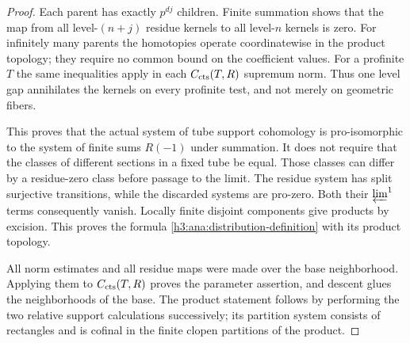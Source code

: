 \begin{proof}
Each parent has exactly $p^{dj}$ children.  Finite summation
shows that the map from all level-$(n+j)$ residue kernels to
all level-$n$ kernels is zero.  For infinitely many parents
the homotopies operate coordinatewise in the product topology;
they require no common bound on the coefficient values.
For a profinite $T$ the same inequalities apply in each
$C_{\mathrm{cts}}(T,R)$ supremum norm.  Thus one level gap annihilates
the kernels on every profinite test, and not merely on
geometric fibers.

This proves that the actual system of tube support cohomology
is pro-isomorphic to the system of finite sums $R(-1)$ under
summation.  It does not require that the classes of different
sections in a fixed tube be equal.  Those classes can differ
by a residue-zero class before passage to the limit.
The residue system has split surjective transitions, while
the discarded systems are pro-zero.  Both their $\varprojlim^1$
terms consequently vanish.  Locally finite disjoint components
give products by excision.  This proves the formula
\eqref{h3:ana:distribution-definition} with its product topology.

All norm estimates and all residue maps were made over the
base neighborhood.  Applying them to $C_{\mathrm{cts}}(T,R)$ proves
the parameter assertion, and descent glues the neighborhoods
of the base.  The product statement follows by performing the
two relative support calculations successively; its partition
system consists of rectangles and is cofinal in the finite
clopen partitions of the product.
\end{proof}

